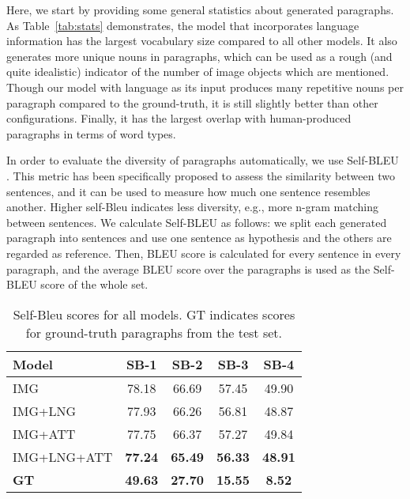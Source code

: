 \documentclass[11pt,a4paper]{article}
\begin{document}
Here, we start by providing some general statistics about generated paragraphs.
As Table~\ref{tab:stats} demonstrates, the model that incorporates language information has the largest vocabulary size compared to all other models.
It also generates more unique nouns in paragraphs, which can be used as a rough (and quite idealistic) indicator of the number of image objects which are mentioned.
Though our model with language as its input produces many repetitive nouns per paragraph compared to the ground-truth, it is still slightly better than other configurations.
Finally, it has the largest overlap with human-produced paragraphs in terms of word types.

In order to evaluate the diversity of paragraphs automatically, we use Self-BLEU \cite{Zhu2018selfbleu}.
This metric has been specifically proposed to assess the similarity between two sentences, and it can be used to measure how much one sentence resembles another.
Higher self-Bleu indicates less diversity, e.g., more n-gram matching between sentences.
We calculate Self-BLEU as follows: we split each generated paragraph into sentences and use one sentence as hypothesis and the others are regarded as reference.
Then, BLEU score is calculated for every sentence in every paragraph, and the average BLEU score over the paragraphs is used as the Self-BLEU score of the whole set.

\begin{table}[h]
    \footnotesize
    \centering
    \begin{tabular}{|l|c|c|c|c|}
    \hline
       \textbf{Model}  &  \textbf{SB-1} & \textbf{SB-2} & \textbf{SB-3} & \textbf{SB-4} \\
    \hline
      IMG   & 78.18 & 66.69 & 57.45 & 49.90 \\
    \hline
      IMG+LNG   & 77.93 & 66.26 & 56.81 & 48.87 \\
    \hline
      IMG+ATT   & 77.75 & 66.37 & 57.27 & 49.84 \\
    \hline
      IMG+LNG+ATT   & \textbf{77.24} & \textbf{65.49} & \textbf{56.33} & \textbf{48.91} \\
    \hline
    \hline
      \textbf{GT}   & \textbf{49.63} & \textbf{27.70} & \textbf{15.55} & \textbf{8.52} \\
     \hline
    \end{tabular}
    \caption{Self-Bleu scores for all models. GT indicates scores for ground-truth paragraphs from the test set.}
    \label{tab:self_bleu}
\end{table}
\end{document}
